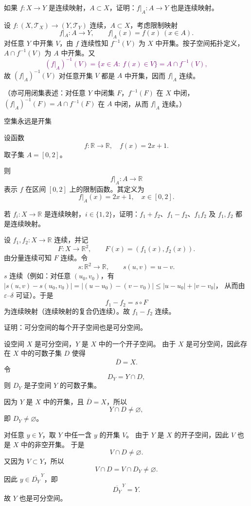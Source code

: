 \begin{homework}[14]
如果 $f:X\to Y$ 是连续映射，$A\subset X$，证明：$f|_A:A\to Y$ 也是连续映射。
\end{homework}
\begin{solution}
设 $f:(X,\mathcal T_X)\to(Y,\mathcal T_Y)$ 连续，$A\subset X$，考虑限制映射
\[
f|_A:A\to Y,\qquad f|_A(x)=f(x)\ (x\in A).
\]
对任意 $Y$ 中开集 $V$，由 $f$ 连续性知 $f^{-1}(V)$ 为 $X$ 中开集。按子空间拓扑定义，
$A\cap f^{-1}(V)$ 为 $A$ 中开集。又
\textcolor{purple}{\[
(f|_A)^{-1}(V)=\{x\in A:\ f(x)\in V\}=A\cap f^{-1}(V),
\]}
故 $(f|_A)^{-1}(V)$ 对任意开集 $V$ 都是 $A$ 中开集，因而 $f|_A$ 连续。

（亦可用闭集表述：对任意 $Y$ 中闭集 $F$，$f^{-1}(F)$ 在 $X$ 中闭，
$(f|_A)^{-1}(F)=A\cap f^{-1}(F)$ 在 $A$ 中闭，从而 $f|_A$ 连续。）
\end{solution}
\begin{note}
    空集永远是开集
\end{note}
\begin{example}
设函数
\[
f:\mathbb{R}\to\mathbb{R},\quad f(x)=2x+1.
\]
取子集 $A=[0,2]$。

则
\[
f|_A:A\to\mathbb{R}
\]
表示 $f$ 在区间 $[0,2]$ 上的限制函数。其定义为
\[
f|_A(x)=2x+1,\quad x\in[0,2].
\]
\end{example}
\begin{homework}[3.2]
若 $f_i:X\to\mathbb{R}$ 是连续映射，$i\in\{1,2\}$，证明：$f_1+f_2$、$f_1-f_2$、$f_1f_2$ 及 $f_1,f_2$ 都是连续映射。
\end{homework}
\begin{solution}
设 $f_1,f_2:X\to\mathbb{R}$ 连续，并记
\[
F:X\to\mathbb{R}^2,\qquad F(x)=(f_1(x),f_2(x)).
\]
由分量连续可知 $F$ 连续。令
\[
s:\mathbb{R}^2\to\mathbb{R},\qquad s(u,v)=u-v.
\]
$s$ 连续（例如：对任意 $(u_0,v_0)$，有
$|s(u,v)-s(u_0,v_0)|=|(u-u_0)-(v-v_0)|\le |u-u_0|+|v-v_0|$，
从而由 $\varepsilon$–$\delta$ 可证）。于是
\[
f_1-f_2=s\circ F
\]
为连续映射（连续映射的复合仍连续）。故 $f_1-f_2$ 连续。
\end{solution}
\begin{homework}[2.1]
证明：可分空间的每个开子空间也是可分空间。
\end{homework}

\begin{solution}
设空间 $X$ 是可分空间，$Y$ 是 $X$ 中的一个开子空间。
由于 $X$ 是可分空间，因此存在 $X$ 中的可数子集 $D$ 使得
\[
\overline{D} = X.
\]
令
\[
D_Y = Y \cap D,
\]
则 $D_Y$ 是子空间 $Y$ 的可数子集。

因为 $Y$ 是 $X$ 中的开集，且 $\overline{D} = X$，所以
\[
Y \cap D \ne \varnothing,
\]
即 $D_Y \ne \varnothing$。

对任意 $y \in Y$，取 $Y$ 中任一含 $y$ 的开集 $V$。
由于 $Y$ 是 $X$ 的开子空间，因此 $V$ 也是 $X$ 中的非空开集。
于是
\[
V \cap D \ne \varnothing.
\]
又因为 $V \subset Y$，所以
\[
V \cap D = V \cap D_Y \ne \varnothing.
\]
因此 $y \in \overline{D_Y}^{\,Y}$，即
\[
\overline{D_Y}^{\,Y} = Y.
\]
故 $Y$ 也是可分空间。
\end{solution}
